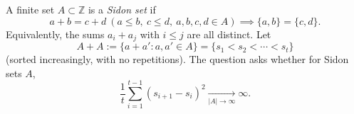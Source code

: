 A finite set $A\subset\mathbb Z$ is a \emph{Sidon set} if
\[
 a+b=c+d\ (a\le b,\ c\le d,\ a,b,c,d\in A)\implies \{a,b\}=\{c,d\}.
\]
Equivalently, the sums $a_i+a_j$ with $i\le j$ are all distinct.
Let
\[
A+A:=\{a+a':a,a'\in A\}=\{s_1<s_2<\cdots<s_t\}
\]
(sorted increasingly, with no repetitions). The question asks whether for Sidon sets $A$,
\[
\frac{1}{t}\sum_{i=1}^{t-1}(s_{i+1}-s_i)^2\xrightarrow[|A|\to\infty]{}\infty.
\]

